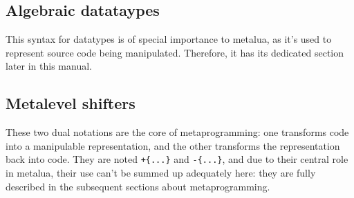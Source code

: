 \subsection{Algebraic datataypes}

This syntax for datatypes is of special importance to metalua, as it's
used to represent source code being manipulated. Therefore, it has its
dedicated section later in this manual.

\subsection{Metalevel shifters}

These two dual notations are the core of metaprogramming: one
transforms code into a manipulable representation, and the other
transforms the representation back into code. They are noted
{\tt+\{...\}} and {\tt-\{...\}}, and due to their central role in
metalua, their use can't be summed up adequately here: they are fully
described in the subsequent sections about metaprogramming.
